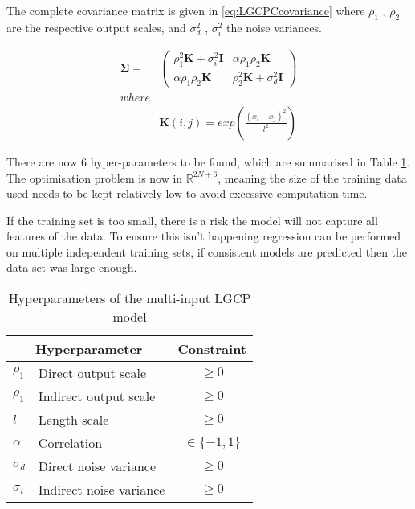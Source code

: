 \documentclass[a4paper,11pt]{report}
\begin{document}
The complete covariance matrix is given in \ref{eq:LGCPCcovariance} where \(\rho_1\) , \(\rho_2\) are the respective output scales, and \(\sigma_d^2\) , \(\sigma_i^2\) the noise variances.

\begin{equation} \label{eq:LGCPCcovariance}
\begin{aligned}
\boldsymbol{\Sigma} =&  \left( \begin{array}{cc}
\rho_1^2 \mathbf{K} + \sigma_i^2 \mathbf{I} & \alpha \rho_1 \rho_2 \mathbf{K}  \\
\alpha \rho_1 \rho_2 \mathbf{K} & \rho_2^2 \mathbf{K} + \sigma_d^2 \mathbf{I} \end{array} \right) \\ where\\
&\mathbf{K}(i,j) = exp\left( \frac{(x_i-x_j)^2}{l^2}\right)
\end{aligned}
\end{equation}

There are now 6 hyper-parameters to be found, which are summarised in Table \ref{LGCPChyperparameters}. The optimisation problem is now in \(\mathds{R}^{2N+6}\), meaning the size of the training data used needs to be kept relatively low to avoid excessive computation time. \par

If the training set is too small, there is a risk the model will not capture all features of the data. To ensure this isn't happening regression can be performed on multiple independent training sets, if consistent models are predicted then the data set was large enough.

\begin{table}[]
\centering
\caption{Hyperparameters of the multi-input LGCP model}
\label{LGCPChyperparameters}
\begin{tabular}{ll|c}
\multicolumn{2}{c|}{\textbf{Hyperparameter}} & \textbf{Constraint} \\ \hline
\(\rho_1\)           & Direct output scale             & \(\geq0\)            \\
\(\rho_1\)             & Indirect output scale           & \(\geq0\)            \\
\(l\)          & Length scale                    & \(\geq0\)            \\
\(\alpha\)             & Correlation                     &  \(\in\{-1,1\}\)                   \\
\(\sigma_d\)             & Direct noise variance           &    \(\geq0\)                 \\
\(\sigma_i\)           & Indirect noise variance         &     \(\geq0\)               
\end{tabular}
\end{table}
\end{document}
